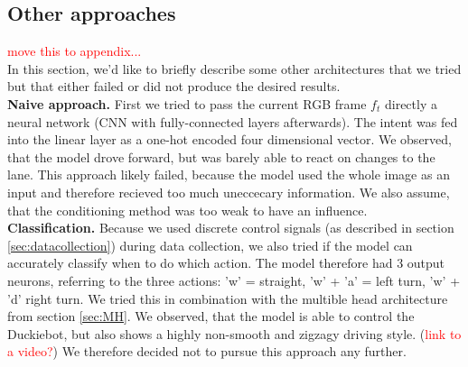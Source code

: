 \subsection{Other approaches}
\label{subsec:other}

\textcolor{red}{move this to appendix...} \\
In this section, we'd like to briefly describe some other architectures that we tried but that either failed or did not produce the desired results. \\
\textbf{Naive approach.} First we tried to pass the current RGB frame $f_t$ directly a neural network (CNN with fully-connected layers afterwards). 
The intent was fed into the linear layer as a one-hot encoded four dimensional vector. 
We observed, that the model drove forward, but was barely able to react on changes to the lane. This approach likely failed, because the model used the whole image as an input and therefore recieved too much uneccecary information. 
We also assume, that the conditioning method was too weak to have an influence. \\
\textbf{Classification.} Because we used discrete control signals (as described in section \ref{sec:datacollection}) during data collection, we also tried if the model can accurately classify when to do which action.
The model therefore had 3 output neurons, referring to the three actions: 'w' = straight, 'w' + 'a' = left turn, 'w' + 'd' right turn. 
We tried this in combination with the multible head architecture from section \ref{sec:MH}. 
We observed, that the model is able to control the Duckiebot, but also shows a highly non-smooth and zigzagy driving style. (\textcolor{red}{link to a video?})
We therefore decided not to pursue this approach any further.
